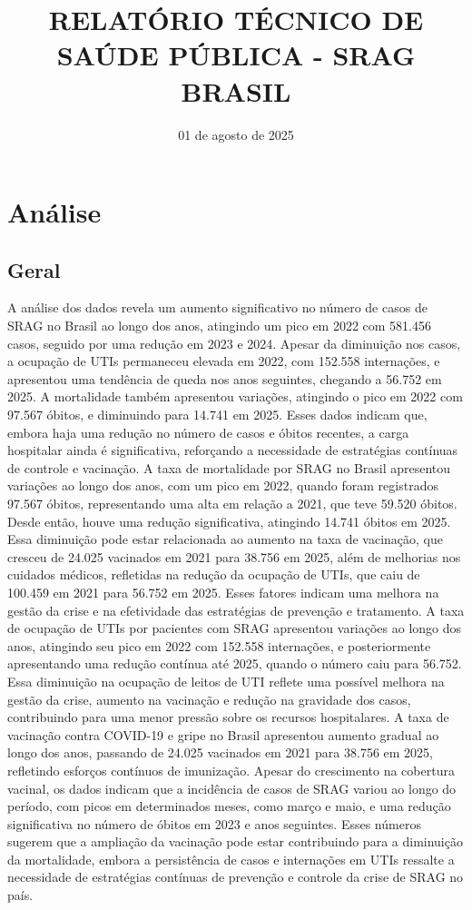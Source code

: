 \documentclass{article}%
\title{\textbf{RELATÓRIO TÉCNICO DE SAÚDE PÚBLICA - SRAG BRASIL}}%
\date{01 de agosto de 2025}%
\begin{document}
%
\normalsize%
\maketitle%
\section{Análise}%
\label{sec:Anlise}%
\subsection{Geral}%
\label{subsec:Geral}%
A análise dos dados revela um aumento significativo no número de casos de SRAG no Brasil ao longo dos anos, atingindo um pico em 2022 com 581.456 casos, seguido por uma redução em 2023 e 2024. Apesar da diminuição nos casos, a ocupação de UTIs permaneceu elevada em 2022, com 152.558 internações, e apresentou uma tendência de queda nos anos seguintes, chegando a 56.752 em 2025. A mortalidade também apresentou variações, atingindo o pico em 2022 com 97.567 óbitos, e diminuindo para 14.741 em 2025. Esses dados indicam que, embora haja uma redução no número de casos e óbitos recentes, a carga hospitalar ainda é significativa, reforçando a necessidade de estratégias contínuas de controle e vacinação.\newline%
%
A taxa de mortalidade por SRAG no Brasil apresentou variações ao longo dos anos, com um pico em 2022, quando foram registrados 97.567 óbitos, representando uma alta em relação a 2021, que teve 59.520 óbitos. Desde então, houve uma redução significativa, atingindo 14.741 óbitos em 2025. Essa diminuição pode estar relacionada ao aumento na taxa de vacinação, que cresceu de 24.025 vacinados em 2021 para 38.756 em 2025, além de melhorias nos cuidados médicos, refletidas na redução da ocupação de UTIs, que caiu de 100.459 em 2021 para 56.752 em 2025. Esses fatores indicam uma melhora na gestão da crise e na efetividade das estratégias de prevenção e tratamento.\newline%
%
A taxa de ocupação de UTIs por pacientes com SRAG apresentou variações ao longo dos anos, atingindo seu pico em 2022 com 152.558 internações, e posteriormente apresentando uma redução contínua até 2025, quando o número caiu para 56.752. Essa diminuição na ocupação de leitos de UTI reflete uma possível melhora na gestão da crise, aumento na vacinação e redução na gravidade dos casos, contribuindo para uma menor pressão sobre os recursos hospitalares.\newline%
%
A taxa de vacinação contra COVID{-}19 e gripe no Brasil apresentou aumento gradual ao longo dos anos, passando de 24.025 vacinados em 2021 para 38.756 em 2025, refletindo esforços contínuos de imunização. Apesar do crescimento na cobertura vacinal, os dados indicam que a incidência de casos de SRAG variou ao longo do período, com picos em determinados meses, como março e maio, e uma redução significativa no número de óbitos em 2023 e anos seguintes. Esses números sugerem que a ampliação da vacinação pode estar contribuindo para a diminuição da mortalidade, embora a persistência de casos e internações em UTIs ressalte a necessidade de estratégias contínuas de prevenção e controle da crise de SRAG no país.\newline%
\end{document}
